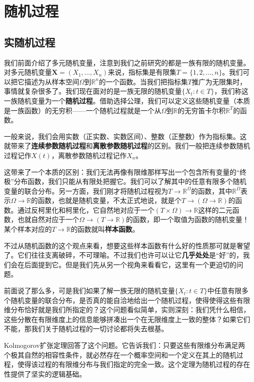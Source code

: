 \section{随机过程}

\subsection{实随机过程}
我们前面介绍了多元随机变量，注意到我们之前研究的都是一族有限的随机变量。对多元随机变量\(\mathbf{X}=(X_1,\ldots,X_n)\)来说，指标集是有限集\(T=\{1,2, \ldots, n\}\)。我们可以把它描述为从样本空间\(\Omega\)到\(\mathbb{R}^n\)的一个函数。当我们把指标集\(T\)推广为无限集时，事情就复杂很多了。我们现在面对的是一族无限的随机变量\(\{X_t:t\in T\}\)，我们称这一族随机变量为一个\textbf{随机过程}。借助选择公理，我们可以定义这些随机变量（本质是一族函数）的无穷积——一个随机过程就是一个从\(\Omega\)到\(\mathbb{R}\)的无穷笛卡尔积\(\mathbb{R}^T\)的函数。

一般来说，我们会用实数（正实数、实数区间）、整数（正整数）作为指标集。这就带来了\textbf{连续参数随机过程}和\textbf{离散参数随机过程}的区别。我们一般把连续参数随机过程记作\(X(t)\)，离散参数随机过程记作\(X_n\)。

这带来了一个本质的区别：我们无法再像有限维那样写出一个包含所有变量的“终极”分布函数，我们只能从有限处把握它。我们可以了解其中的任意有限多个随机变量的联合分布。另一方面，我们刚才将随机过程视为\(T\to \mathbb{R}^{\Omega}\)的函数，其中\(\mathbb{R}^{\Omega}\)表示\(\Omega \to \mathbb{R}\)的函数，也就是随机变量，不太正式地说，就是个\(T\to(\Omega \to \mathbb{R})\)的函数。通过反柯里化和柯里化，它自然地对应于一个\((T\times \Omega) \to \mathbb{R}\)这样的二元函数，也就自然对应于一个\(\Omega\to(T \to \mathbb{R})\)的函数，即一个取值为函数的随机变量！某个样本对应的\(T \to \mathbb{R}\)的函数就叫\textbf{样本函数}。

不过从随机函数的这个观点来看，想要这些样本函数有什么好的性质那可就是奢望了。它们往往支离破碎，不可理喻。不过我们也许可以让它\textbf{几乎处处}是“好”的，我们会在后面提到它。但是我们先从另一个视角来看看它，这里有一个更迫切的问题。

前面说了那么多，可是我们如果了解一族无限的随机变量\(\{X_t:t\in T\}\)中任意有限多个随机变量的联合分布，是否真的能自洽地给出一个随机过程，使得使得这些有限维分布恰好就是我们所指定的？这个问题看似简单，实则深刻：我们凭什么相信，这些分散在有限维度上的信息能够拼凑出一个在无限维度上一致的整体？如果它们不能，那我们关于随机过程的一切讨论都将失去根基。

Kolmogorov扩张定理回答了这个问题。它告诉我们：只要这些有限维分布满足两个极其自然的相容性条件，就必然存在一个概率空间和一个定义在其上的随机过程，使得该过程的有限维分布与我们指定的完全一致。这个定理为随机过程的存在性提供了坚实的逻辑基础。

